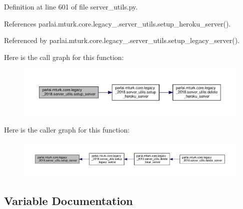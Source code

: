 Definition at line 601 of file server\+\_\+utils.\+py.



References parlai.\+mturk.\+core.\+legacy\+\_.\+server\+\_\+utils.\+setup\+\_\+heroku\+\_\+server().



Referenced by parlai.\+mturk.\+core.\+legacy\+\_.\+server\+\_\+utils.\+setup\+\_\+legacy\+\_\+server().

Here is the call graph for this function\+:
\nopagebreak
\begin{figure}[H]
\begin{center}
\leavevmode
\includegraphics[width=350pt]{namespaceparlai_1_1mturk_1_1core_1_1legacy__2018_1_1server__utils_af65b71753d79d3513be6d4c890853a4d_cgraph}
\end{center}
\end{figure}
Here is the caller graph for this function\+:
\nopagebreak
\begin{figure}[H]
\begin{center}
\leavevmode
\includegraphics[width=350pt]{namespaceparlai_1_1mturk_1_1core_1_1legacy__2018_1_1server__utils_af65b71753d79d3513be6d4c890853a4d_icgraph}
\end{center}
\end{figure}


\subsection{Variable Documentation}
\mbox{\label{namespaceparlai_1_1mturk_1_1core_1_1legacy__2018_1_1server__utils_a0720e56a92f8f89ff045aa75a6218c32}} 

